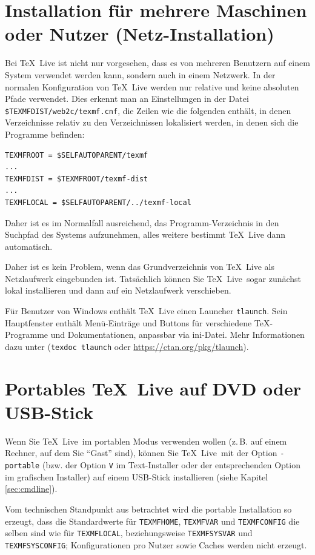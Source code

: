\documentclass[12pt,ngerman,a4paper,fullparskip]{scrreprt}
\newcommand{\TL}{\TeX\ Live\xspace}
\newcommand{\code}[1]{\texttt{#1}}
\newcommand{\optname}[1]{\texttt{#1}}
\newcommand{\filename}[1]{\texttt{#1}}
\newcommand{\envname}[1]{\texttt{#1}}
\begin{document}
\chapter{Installation für mehrere Maschinen oder Nutzer (Netz-Installation)}
\label{sec:sharedinstall}

Bei \TL ist nicht nur vorgesehen, dass es von mehreren Benutzern auf einem System verwendet werden kann, sondern auch in einem Netzwerk. In der normalen Konfiguration von \TL werden nur relative und keine absoluten Pfade verwendet. Dies erkennt man an Einstellungen in der Datei {\small \filename{\$TEXMFDIST/web2c/texmf.cnf}}, die Zeilen wie die folgenden enthält, in denen Verzeichnisse relativ zu den Verzeichnissen lokalisiert werden, in denen sich die Programme befinden:

\begin{verbatim}
TEXMFROOT = $SELFAUTOPARENT/texmf
...
TEXMFDIST = $TEXMFROOT/texmf-dist
...
TEXMFLOCAL = $SELFAUTOPARENT/../texmf-local
\end{verbatim}

Daher ist es im Normalfall ausreichend, das Programm-Verzeichnis in den Suchpfad des Systems aufzunehmen, alles weitere bestimmt \TL dann automatisch.

Daher ist es kein Problem, wenn das Grundverzeichnis von \TL als Netz\-lauf\-werk eingebunden ist. Tatsächlich können Sie \TL\ sogar zunächst lokal installieren und dann auf ein Netzlaufwerk verschieben.

Für Benutzer von Windows enthält \TL{} einen Launcher \filename{tlaunch}. Sein Hauptfenster enthält Menü-Einträge und Buttons für verschiedene \TeX-Programme und Dokumentationen, anpassbar via ini-Datei.
Mehr Informationen dazu unter (\code{texdoc tlaunch} oder \url{https://ctan.org/pkg/tlaunch}).


\chapter{Portables \TL  auf DVD oder USB-Stick}\label{sec:portable-tl}

Wenn Sie \TL\ im portablen Modus verwenden wollen (z.\,B. auf einem Rechner, auf dem Sie "`Gast"' sind), können Sie \TL\ mit der Option \optname{-portable} (bzw. der Option \code{V} im Text-Installer oder der entsprechenden Option im grafischen Installer) auf einem USB-Stick installieren (siehe Kapitel \ref{sec:cmdline}). 

Vom technischen Standpunkt aus betrachtet wird die portable Installation so erzeugt, dass die Standardwerte für \envname{TEXMFHOME}, \envname{TEXMFVAR} und \envname{TEXMFCONFIG} die selben sind wie für \envname{TEXMFLOCAL}, beziehungsweise 
\envname{TEXMFSYSVAR}  und \envname{TEXMFSYSCONFIG}; Konfigurationen pro Nutzer sowie Caches werden nicht erzeugt.
\end{document}
